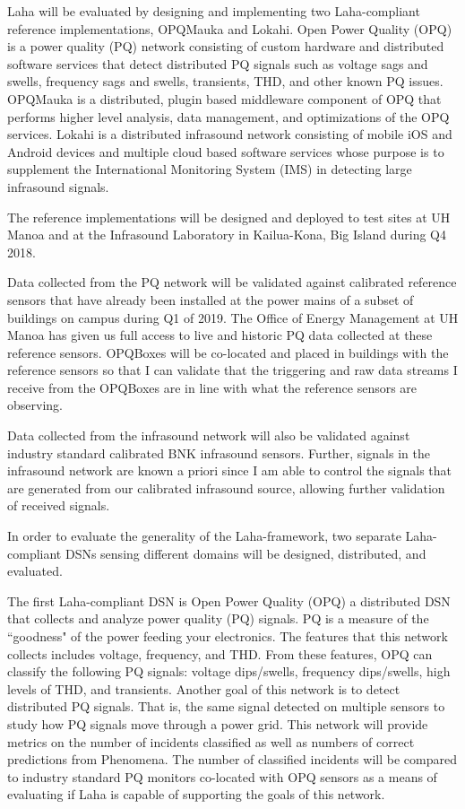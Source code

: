 Laha will be evaluated by designing and implementing two Laha-compliant reference implementations, OPQMauka and Lokahi. Open Power Quality (OPQ) is a power quality (PQ) network consisting of custom hardware and distributed software services that detect distributed PQ signals such as voltage sags and swells, frequency sags and swells, transients, THD, and other known PQ issues. OPQMauka is a distributed, plugin based middleware component of OPQ that performs higher level analysis, data management, and optimizations of the OPQ services. Lokahi is a distributed infrasound network consisting of mobile iOS and Android devices and multiple cloud based software services whose purpose is to supplement the International Monitoring System (IMS) in detecting large infrasound signals.

The reference implementations will be designed and deployed to test sites at UH Manoa and at the Infrasound Laboratory in Kailua-Kona, Big Island during Q4 2018. 

Data collected from the PQ network will be validated against calibrated reference sensors that have already been installed at the power mains of a subset of buildings on campus during Q1 of 2019. The Office of Energy Management at UH Manoa has given us full access to live and historic PQ data collected at these reference sensors. OPQBoxes will be co-located and placed in buildings with the reference sensors so that I can validate that the triggering and raw data streams I receive from the OPQBoxes are in line with what the reference sensors are observing.

Data collected from the infrasound network will also be validated against industry standard calibrated BNK infrasound sensors. Further, signals in the infrasound network are known a priori since I am able to control the signals that are generated from our calibrated infrasound source, allowing further validation of received signals.

In order to evaluate the generality of the Laha-framework, two separate Laha-compliant DSNs sensing different domains will be designed, distributed, and evaluated. 

The first Laha-compliant DSN is Open Power Quality (OPQ) a distributed DSN that collects and analyze power quality (PQ) signals. PQ is a measure of the ``goodness" of the power feeding your electronics. The features that this network collects includes voltage, frequency, and THD. From these features, OPQ can classify the following PQ signals: voltage dips/swells, frequency dips/swells, high levels of THD, and transients. Another goal of this network is to detect distributed PQ signals. That is, the same signal detected on multiple sensors to study how PQ signals move through a power grid. This network will provide metrics on the number of incidents classified as well as numbers of correct predictions from Phenomena. The number of classified incidents will be compared to industry standard PQ monitors co-located with OPQ sensors as a means of evaluating if Laha is capable of supporting the goals of this network.

